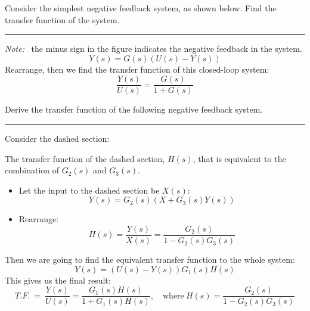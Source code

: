 \begin{ex}{}
Consider the simplest negative feedback system, as shown below. Find the transfer function of the system.
\begin{figure}[H] 
    \centering
    
\end{figure}
\hrule \vspace{.3cm} 
\textit{Note:} \  the minus sign in the figure indicates the negative feedback in the system.
\[ Y(s) = G(s)(U(s)-Y(s))\]
Rearrange, then we find the transfer function of this closed-loop system:
\[\boxed{\frac{Y(s)}{U(s)} = \frac{G(s)}{1+G(s)}}\]
\end{ex}
\begin{ex}{} 
Derive the transfer function of the following negative feedback system.
\begin{figure}[H] 
    \centering
    
\end{figure}
\hrule \vspace{.3cm} 
Consider the dashed section: 
\begin{figure}[H] 
    \centering
    
\end{figure}
The transfer function of the dashed section, $H(s)$, that is equivalent to the combination of $G_{2}(s)$ and $G_{3}(s)$.
\begin{itemize}
    \item Let the input to the dashed section be $X(s)$:
        \[Y(s) = G_{2}(s)(X+G_{3}(s)Y(s))\]
    \item Rearrange:
        \[
        H(s) = \frac{Y(s)}{X(s)} = \frac{G_{2}(s)}{1-G_{2}(s)G_{3}(s)}
        \]
\end{itemize}
Then we are going to find the equivalent transfer function to the whole system:
\[Y(s) =(U(s)-Y(s))G_{1}(s)H(s)\]
This gives us the final result:
\[
T.F. \ = \ 
\frac{Y(s)}{U(s)} = 
\frac{G_{1}(s)H(s)}{1+G_{1}(s)H(s)}, \quad \text{where} \ 
H(s) = \frac{G_{2}(s)}{1-G_{2}(s)G_{3}(s)}
\]
\end{ex}
